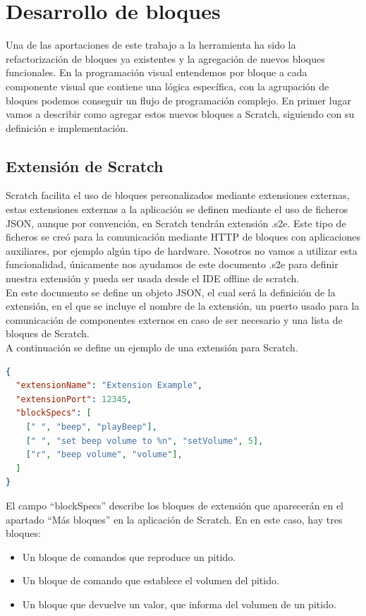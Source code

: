 \section{Desarrollo de bloques}
\label{sec:desarrollo-de-bloques}

Una de las aportaciones de este trabajo a la herramienta ha sido la refactorización de bloques ya existentes y la agregación de nuevos bloques funcionales.
En la programación visual entendemos por bloque a cada componente visual que contiene una lógica específica, con la agrupación de bloques podemos conseguir un flujo de programación complejo. En primer lugar vamos a describir como agregar estos nuevos bloques a Scratch, siguiendo con su definición e implementación.

\subsection{Extensión de Scratch}

Scratch facilita el uso de bloques personalizados mediante extensiones externas, estas  extensiones externas a la aplicación se definen mediante el uso de ficheros JSON, aunque por convención, en Scratch tendrán extensión .s2e. Este tipo de ficheros se creó para la comunicación mediante HTTP de bloques con aplicaciones auxiliares, por ejemplo algún tipo de hardware. Nosotros no vamos a utilizar esta funcionalidad, únicamente nos ayudamos de este documento .s2e para definir nuestra extensión y pueda ser usada desde el IDE offline de scratch.\\

En este documento se define un objeto JSON, el cual será la definición de la extensión, en el que se incluye el nombre de la extensión, un puerto usado para la comunicación de componentes externos en caso de ser necesario y una lista de bloques de Scratch. \\

A continuación se define un ejemplo de una extensión para Scratch. 
\begin{lstlisting}[language=json,firstnumber=1]
{ 
  "extensionName": "Extension Example",
  "extensionPort": 12345,
  "blockSpecs": [
    [" ", "beep", "playBeep"],
	[" ", "set beep volume to %n", "setVolume", 5],
	["r", "beep volume", "volume"],
  ]
}
\end{lstlisting}

El campo ``blockSpecs'' describe los bloques de extensión que aparecerán en el apartado ``Más bloques'' en la aplicación de Scratch.
En en este caso, hay tres bloques:
\begin{itemize}
\item Un bloque de comandos que reproduce un pitido.
\item Un bloque de comando que
establece el volumen del pitido.
\item Un bloque que devuelve un valor, que informa del volumen de un pitido.
\end{itemize}

